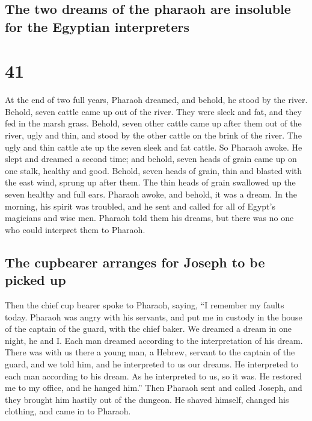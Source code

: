 \hypertarget{the-two-dreams-of-the-pharaoh-are-insoluble-for-the-egyptian-interpreters}{%
\subsection{The two dreams of the pharaoh are insoluble for the Egyptian
interpreters}\label{the-two-dreams-of-the-pharaoh-are-insoluble-for-the-egyptian-interpreters}}

\hypertarget{section-40}{%
\section{41}\label{section-40}}

 At the end of two full years, Pharaoh dreamed, and
behold, he stood by the river.  Behold, seven cattle came
up out of the river. They were sleek and fat, and they fed in the marsh
grass.  Behold, seven other cattle came up after them out
of the river, ugly and thin, and stood by the other cattle on the brink
of the river.  The ugly and thin cattle ate up the seven
sleek and fat cattle. So Pharaoh awoke.  He slept and
dreamed a second time; and behold, seven heads of grain came up on one
stalk, healthy and good.  Behold, seven heads of grain,
thin and blasted with the east wind, sprung up after them.
 The thin heads of grain swallowed up the seven healthy
and full ears. Pharaoh awoke, and behold, it was a dream. 
In the morning, his spirit was troubled, and he sent and called for all
of Egypt's magicians and wise men. Pharaoh told them his dreams, but
there was no one who could interpret them to Pharaoh.

\hypertarget{the-cupbearer-arranges-for-joseph-to-be-picked-up}{%
\subsection{The cupbearer arranges for Joseph to be picked
up}\label{the-cupbearer-arranges-for-joseph-to-be-picked-up}}

 Then the chief cup bearer spoke to Pharaoh, saying, ``I
remember my faults today.  Pharaoh was angry with his
servants, and put me in custody in the house of the captain of the
guard, with the chief baker.  We dreamed a dream in one
night, he and I. Each man dreamed according to the interpretation of his
dream.  There was with us there a young man, a Hebrew,
servant to the captain of the guard, and we told him, and he interpreted
to us our dreams. He interpreted to each man according to his dream.
 As he interpreted to us, so it was. He restored me to my
office, and he hanged him.''  Then Pharaoh sent and
called Joseph, and they brought him hastily out of the dungeon. He
shaved himself, changed his clothing, and came in to Pharaoh.

